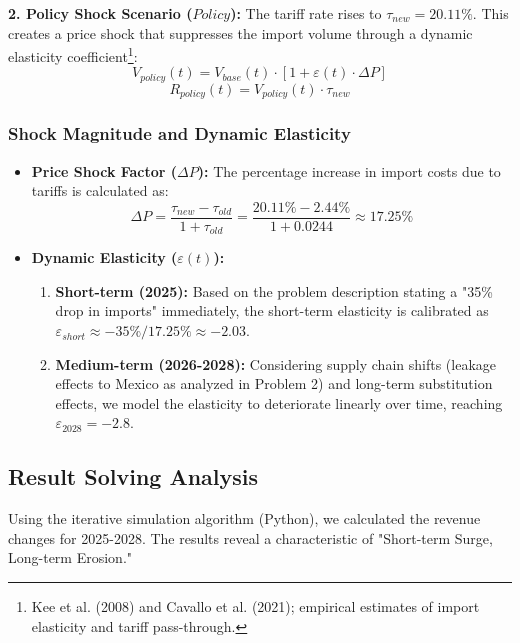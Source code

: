 \documentclass{apmcmthesis}
\begin{document}
\textbf{2. Policy Shock Scenario ($Policy$):} The tariff rate rises to $\tau_{new} = 20.11\%$. This creates a price shock that suppresses the import volume through a dynamic elasticity coefficient\footnote{\cite{Kee2008, Cavallo2021} Kee et al. (2008) and Cavallo et al. (2021); empirical estimates of import elasticity and tariff pass-through.}:
\begin{equation}
    V_{policy}(t) = V_{base}(t) \cdot [1 + \varepsilon(t) \cdot \Delta P]
\end{equation}
\begin{equation}
    R_{policy}(t) = V_{policy}(t) \cdot \tau_{new}
\end{equation}

\subsubsection{Shock Magnitude and Dynamic Elasticity}
\begin{itemize}
    \item \textbf{Price Shock Factor ($\Delta P$):} The percentage increase in import costs due to tariffs is calculated as:
    \begin{equation}
        \Delta P = \frac{\tau_{new} - \tau_{old}}{1 + \tau_{old}} = \frac{20.11\% - 2.44\%}{1 + 0.0244} \approx 17.25\%
    \end{equation}
    
    \item \textbf{Dynamic Elasticity ($\varepsilon(t)$):} 
    \begin{enumerate}
        \item \textbf{Short-term (2025):} Based on the problem description stating a "35\% drop in imports" immediately, the short-term elasticity is calibrated as $\varepsilon_{short} \approx -35\% / 17.25\% \approx -2.03$.
        \item \textbf{Medium-term (2026-2028):} Considering supply chain shifts (leakage effects to Mexico as analyzed in Problem 2) and long-term substitution effects, we model the elasticity to deteriorate linearly over time, reaching $\varepsilon_{2028} = -2.8$.
    \end{enumerate}
\end{itemize}

\subsection{Result Solving Analysis}
Using the iterative simulation algorithm (Python), we calculated the revenue changes for 2025-2028. The results reveal a characteristic of "Short-term Surge, Long-term Erosion."
\end{document}
